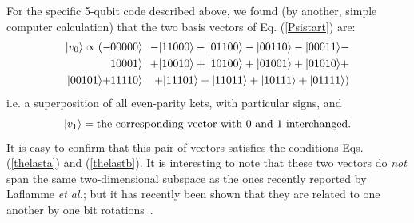 For the specific 5-qubit code described above, we found (by another,
simple computer calculation) that the two basis vectors of
Eq. (\ref{Psistart}) are:
\begin{eqnarray}
\ket{v_0} \propto (-&\!\!\ket{00000}\!\!& -
\ket{11000} -
\ket{01100} -
\ket{00110} -
\ket{00011} - \\
&\!\!\ket{10001}\!\!& +
\ket{10010} +
\ket{10100} +
\ket{01001} +
\ket{01010} + \nonumber\\
\ket{00101} +
&\!\!\ket{11110}\!\!& +
\ket{11101} +
\ket{11011} +
\ket{10111} +
\ket{01111} )\nonumber\label{vc1}
\end{eqnarray}
i.e. a superposition of all even-parity kets, with particular
signs, and
\begin{equation}
| v_1 \rangle = \mbox{the corresponding vector with 0 and
1 interchanged.}\label{vc2}
\end{equation}
It is easy to confirm that this
pair of vectors satisfies the conditions Eqs. (\ref{thelasta}) and 
(\ref{thelastb}).  It is
interesting to note that these two vectors do {\it not} span the same
two-dimensional subspace as the ones recently reported by Laflamme
{\it et al.}\cite{Laflamme}; but it has recently been shown
that they are related to one another by one bit rotations~\cite{DS}.

